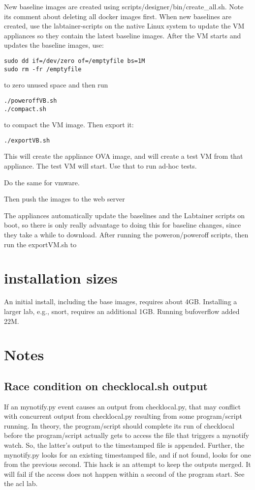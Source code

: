 \documentclass[12pt]{article}
\begin{document}
New baseline images are created using scripts/designer/bin/create\_all.sh.  Note its comment
about deleting all docker images first.  When new baselines are created, use the labtainer-scripts
on the native Linux system to update the VM appliances so they contain the latest baseline images.
After the VM starts and updates the baseline images, use:
\begin{verbatim}
sudo dd if=/dev/zero of=/emptyfile bs=1M
sudo rm -fr /emptyfile
\end{verbatim}
\noindent to zero unused space and then run
\begin{verbatim}
./poweroffVB.sh
./compact.sh
\end{verbatim}
\noindent to compact the VM image.  Then export it:
\begin{verbatim}
./exportVB.sh
\end{verbatim}
\noindent This will create the appliance OVA image, and will create a test
VM from that appliance.  The test VM will start.  Use that to run ad-hoc
tests.

Do the same for vmware.

Then push the images to the web server

The appliances automatically update the baselines and the Labtainer scripts on boot, so there
is only really advantage to doing this for baseline changes, since they take a while to download.
After running the poweron/poweroff scripts, then run the exportVM.sh to 

\section {installation sizes}
An initial install, including the base images, requires about 4GB.  Installing a larger lab,
e.g., snort, requires an additional 1GB.  Running bufoverflow added 22M.


\section {Notes}
\subsection {Race condition on checklocal.sh output}
If an mynotify.py event causes an output from checklocal.py, that may conflict with
concurrent output from checklocal.py resulting from some program/script running.  In 
theory, the program/script should complete its run of checklocal before the program/script
actually gets to access the file that triggers a mynotify watch.  So, the latter's output
to the timestamped file is appended.  Further, the mynotify.py looks for an existing timestamped
file, and if not found, looks for one from the previous second.  This hack is an attempt to
keep the outputs merged.  It will fail if the access does not happen within a second of the
program start.  See the acl lab.
\end{document}
